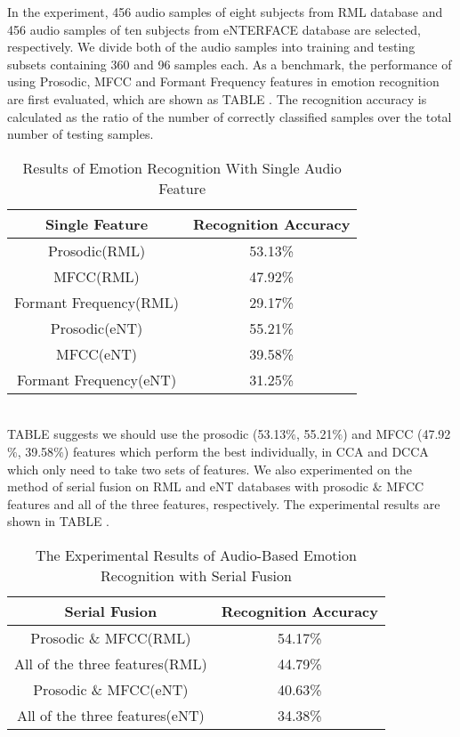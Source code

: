 \documentclass[journal]{IEEEtran}
\begin{document}
In the experiment, 456 audio samples of eight subjects from RML database and 456 audio samples of ten subjects from eNTERFACE database are selected, respectively. We divide both of the audio samples into training and testing subsets containing 360 and 96 samples each. As a benchmark, the performance of using Prosodic, MFCC and Formant Frequency features in emotion recognition are first evaluated, which are shown as TABLE \uppercase\expandafter{}. The recognition accuracy is calculated as the ratio of the number of correctly classified samples over the total number of testing samples.\\
\vspace*{-10pt}
\begin{table}[h]
\normalsize
\renewcommand{\arraystretch}{1.0}
\caption{\normalsize{Results of Emotion Recognition With Single Audio Feature}}
\setlength{\abovecaptionskip}{0pt}
\setlength{\belowcaptionskip}{10pt}
\centering
\tabcolsep 0.073in
\begin{tabular}{cc}
\hline
Single Feature & Recognition Accuracy\\
\hline
Prosodic(RML) &53.13\%\\
MFCC(RML) &47.92\%\\
Formant Frequency(RML) &29.17\%\\
Prosodic(eNT) &55.21\%\\
MFCC(eNT) &39.58\%\\
Formant Frequency(eNT) &31.25\%\\
\hline
\end{tabular}
\end{table}\\

TABLE \uppercase\expandafter{} suggests we should use the prosodic (53.13$\%$, 55.21$\%$) and MFCC (47.92$\%$, 39.58$\%$) features which perform the best individually, in CCA and DCCA which only need to take two sets of features. We also experimented on the method of serial fusion on RML and eNT databases with prosodic $\&$ MFCC features and all of the three features, respectively. The experimental results are shown in TABLE \uppercase\expandafter{}.
\vspace*{-10pt}
\begin{table}[h]
\normalsize
\renewcommand{\arraystretch}{1.0}
\caption{\normalsize{The Experimental Results of Audio-Based Emotion Recognition with Serial Fusion}}
\setlength{\abovecaptionskip}{0pt}
\setlength{\belowcaptionskip}{10pt}
\centering
\tabcolsep 0.073in
\begin{tabular}{cc}
\hline
Serial Fusion & Recognition Accuracy\\
\hline
 Prosodic \& MFCC(RML)  &54.17\%\\
 All of the three features(RML) &44.79\%\\
 Prosodic \& MFCC(eNT)  &40.63\%\\
 All of the three features(eNT) &34.38\%\\
\hline
\end{tabular}
\end{table}\\
\end{document}
